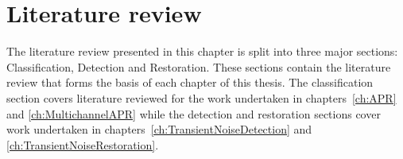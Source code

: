 \chapter{Literature review}\label{ch:LiteratureReview}

\ifpdf
    \graphicspath{{Chapter2_LitReview/Chapter2Figs/PNG/}{Chapter2_LitReview/Chapter2Figs/PDF/}{Chapter2_LitReview/Chapter2Figs/}{Chapter2_LitReview/Chapter2Figs/Classification/}{Chapter2_LitReview/Chapter2Figs/Detection/}{Chapter2_LitReview/Chapter2Figs/Restoration}}
\else
    \graphicspath{{Chapter2_LitReview/Chapter2Figs/EPS/}{Chapter2_LitReview/Chapter2Figs/}}
\fi

The literature review presented in this chapter is split into three major sections: Classification, Detection and Restoration. These sections contain the literature review that forms the basis of each chapter of this thesis. The classification section covers literature reviewed for the work undertaken in chapters~\ref{ch:APR} and \ref{ch:MultichannelAPR} while the detection and restoration sections cover work undertaken in chapters~\ref{ch:TransientNoiseDetection} and \ref{ch:TransientNoiseRestoration}.

